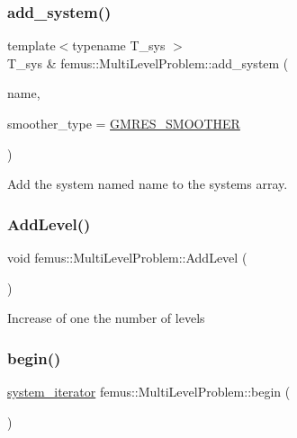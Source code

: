 \subsubsection{\texorpdfstring{add\+\_\+system()}{add\_system()}\hspace{0.1cm}{\footnotesize\ttfamily [2/2]}}
{\footnotesize\ttfamily template$<$typename T\+\_\+sys $>$ \\
T\+\_\+sys \& femus\+::\+Multi\+Level\+Problem\+::add\+\_\+system (\begin{DoxyParamCaption}\item[{const std\+::string \&}]{name,  }\item[{const \mbox{\hyperlink{_mg_smoother_enum_8hpp_a4d11c2ff93e2f0f440c879a9c40cda71}{Mg\+Smoother}} \&}]{smoother\+\_\+type = {\ttfamily \mbox{\hyperlink{_mg_smoother_enum_8hpp_a4d11c2ff93e2f0f440c879a9c40cda71a26fb8f97b66d2d778bf41c32a9899191}{G\+M\+R\+E\+S\+\_\+\+S\+M\+O\+O\+T\+H\+ER}}} }\end{DoxyParamCaption})\hspace{0.3cm}{\ttfamily [inline]}}

Add the system named {\ttfamily name} to the systems array. \mbox{\label{classfemus_1_1_multi_level_problem_a04443ff7c4b5db510a4904fff2cf0c36}} 
\subsubsection{\texorpdfstring{Add\+Level()}{AddLevel()}}
{\footnotesize\ttfamily void femus\+::\+Multi\+Level\+Problem\+::\+Add\+Level (\begin{DoxyParamCaption}{ }\end{DoxyParamCaption})\hspace{0.3cm}{\ttfamily [inline]}}

Increase of one the number of levels \mbox{\label{classfemus_1_1_multi_level_problem_a80af4ecd1c49cefb92b38da8b193eceb}} 
\subsubsection{\texorpdfstring{begin()}{begin()}\hspace{0.1cm}{\footnotesize\ttfamily [1/2]}}
{\footnotesize\ttfamily \mbox{\hyperlink{classfemus_1_1_multi_level_problem_a0b963c16fa79db05093ceefa48cfe6f2}{system\+\_\+iterator}} femus\+::\+Multi\+Level\+Problem\+::begin (\begin{DoxyParamCaption}{ }\end{DoxyParamCaption})\hspace{0.3cm}{\ttfamily [inline]}}

